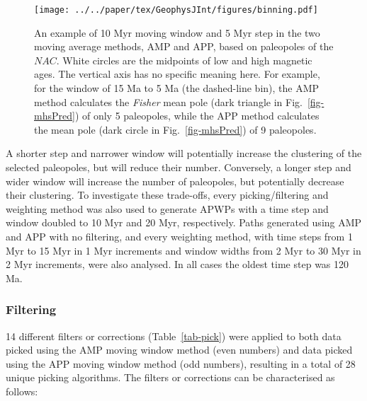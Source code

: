 \begin{figure}[!ht]
  \centering
  \texttt{[image: ../../paper/tex/GeophysJInt/figures/binning.pdf]}
  \caption[How moving average methods work]{An example of 10 Myr moving window
    and 5 Myr step in the two moving average methods, AMP and APP, based on
    paleopoles of the $NAC$. White circles are the midpoints of low and high
    magnetic ages. The vertical axis has no specific meaning here. For example,
    for the window of 15 Ma to 5 Ma (the dashed-line bin), the AMP method
    calculates the \emph{Fisher} mean pole (dark triangle in Fig.~\ref{fig-mhsPred}) of
    only 5 paleopoles, while the APP method calculates the mean pole (dark
    circle in Fig.~\ref{fig-mhsPred}) of 9 paleopoles.}\label{fig-nac-maplat}
\end{figure}

A shorter step and narrower window will potentially increase the clustering of
the selected paleopoles, but will reduce their number. Conversely, a longer step
and wider window will increase the number of paleopoles, but potentially
decrease their clustering. To investigate these trade-offs, every
picking/filtering and weighting method was also used to generate APWPs with a
time step and window doubled to 10 Myr and 20 Myr, respectively. Paths generated
using AMP and APP with no filtering, and every weighting method, with time steps
from 1 Myr to 15 Myr in 1 Myr increments and window widths from 2 Myr to 30 Myr
in 2 Myr increments, were also analysed. In all cases the oldest time step was
120 Ma.

\subsubsection{Filtering}\label{sec:f}

14 different filters or corrections (Table~\ref{tab-pick}) were applied to both
data picked using the AMP moving window method (even numbers) and data picked
using the APP moving window method (odd numbers), resulting in a total of 28
unique picking algorithms. The filters or corrections can be characterised as
follows:

